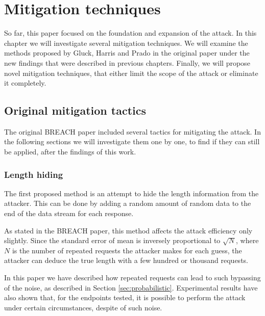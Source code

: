 \chapter{Mitigation techniques}\label{ch:mitigation}

So far, this paper focused on the foundation and expansion of the attack. In
this chapter we will investigate several mitigation techniques. We will examine
the methods proposed by Gluck, Harris and Prado in the original paper under the
new findings that were described in previous chapters. Finally, we will propose
novel mitigation techniques, that either limit the scope of the attack or
eliminate it completely.

\section{Original mitigation tactics}\label{sec:original_mitigation}

The original BREACH paper \cite{breach} included several tactics for mitigating
the attack. In the following sections we will investigate them one by one, to
find if they can still be applied, after the findings of this work.

\subsection{Length hiding}

The first proposed method is an attempt to hide the length information from the
attacker. This can be done by adding a random amount of random data to the end
of the data stream for each response.

As stated in the BREACH paper, this method affects the attack efficiency only
slightly. Since the standard error of mean is inversely proportional to
\begin{math}\sqrt{N}\end{math}, where \begin{math}N\end{math} is the number of
repeated requests the attacker makes for each guess, the attacker can deduce the
true length with a few hundred or thousand requests.

In this paper we have described how repeated requests can lead to such bypassing
of the noise, as described in Section \ref{sec:probabilistic}.  Experimental
results have also shown that, for the endpoints tested, it is possible to
perform the attack under certain circumstances, despite of such noise.

